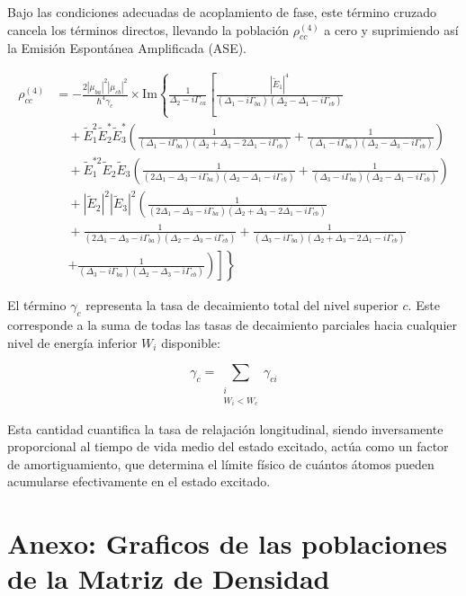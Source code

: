 \documentclass[12pt,a4paper]{article}
\begin{document}
Bajo las condiciones adecuadas de acoplamiento de fase, este término cruzado cancela los términos directos, llevando la población $\rho_{cc}^{(4)}$ a cero y suprimiendo así la Emisión Espontánea Amplificada (ASE).

\begin{equation}
\begin{aligned}
\rho_{cc}^{(4)} &= -\frac{2|\mu_{ba}|^2 |\mu_{cb}|^2}{\hbar^4 \gamma_c} \times \text{Im} \left\{ \frac{1}{\Delta_2 - i\Gamma_{ca}} \left[ \frac{|\tilde{E}_1|^4}{(\Delta_1 - i\Gamma_{ba})(\Delta_2 - \Delta_1 - i\Gamma_{cb})} \right. \right. \\
&\quad + \tilde{E}_1^2 \tilde{E}_2^* \tilde{E}_3^* \left( \frac{1}{(\Delta_1 - i\Gamma_{ba})(\Delta_2 + \Delta_3 - 2\Delta_1 - i\Gamma_{cb})} + \frac{1}{(\Delta_1 - i\Gamma_{ba})(\Delta_2 - \Delta_3 - i\Gamma_{cb})} \right) \\
&\quad + \tilde{E}_1^{*2} \tilde{E}_2 \tilde{E}_3 \left( \frac{1}{(2\Delta_1 - \Delta_3 - i\Gamma_{ba})(\Delta_2 - \Delta_1 - i\Gamma_{cb})} + \frac{1}{(\Delta_3 - i\Gamma_{ba})(\Delta_2 - \Delta_1 - i\Gamma_{cb})} \right) \\
&\quad + |\tilde{E}_2|^2 |\tilde{E}_3|^2 \left( \frac{1}{(2\Delta_1 - \Delta_3 - i\Gamma_{ba})(\Delta_2 + \Delta_3 - 2\Delta_1 - i\Gamma_{cb})} \right. \\
&\quad + \frac{1}{(2\Delta_1 - \Delta_3 - i\Gamma_{ba})(\Delta_2 - \Delta_3 - i\Gamma_{cb})} + \frac{1}{(\Delta_3 - i\Gamma_{ba})(\Delta_2 + \Delta_3 - 2\Delta_1 - i\Gamma_{cb})} \\
&\quad \left. \left. \left. + \frac{1}{(\Delta_3 - i\Gamma_{ba})(\Delta_2 - \Delta_3 - i\Gamma_{cb})} \right) \right] \right\}
\end{aligned} \tag{5}
\end{equation}

El término $\gamma_c$ representa la tasa de decaimiento total del nivel superior $c$. Este corresponde a la suma de todas las tasas de decaimiento parciales hacia cualquier nivel de energía inferior $W_i$ disponible: 

\begin{equation}
    \gamma_c = \sum_{\substack{i \\ W_i < W_c}} \gamma_{ci}
\end{equation}

Esta cantidad cuantifica la tasa de relajación longitudinal, siendo inversamente proporcional al tiempo de vida medio del estado excitado, actúa como un factor de amortiguamiento, que determina el límite físico de cuántos átomos pueden acumularse efectivamente en el estado excitado.

\newpage
\section{Anexo: Graficos de las poblaciones de la Matriz de Densidad}
\end{document}
